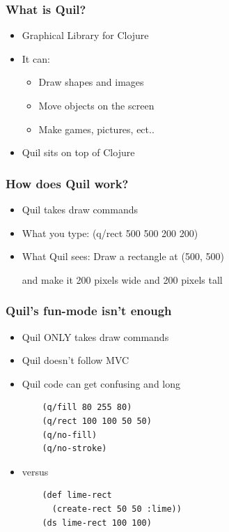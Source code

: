 \documentclass{beamer}
\begin{document}
\begin{frame}
	\frametitle{What is Quil?}
	\begin{itemize}
  		\item Graphical Library for Clojure
  		\item It can:
  		\begin{itemize}
  	 		\item Draw shapes and images
  	 		\item Move objects on the screen
  	 		\item Make games, pictures, ect..
  		\end{itemize}
  		\item Quil sits on top of Clojure
	 \end{itemize}
\end{frame}

\begin{frame}
	\frametitle{How does Quil work?}
	\begin{itemize}
  		\item Quil takes draw commands
  	 	\item What you type: (q/rect 500 500 200 200)
  	 	\item What Quil sees: Draw a rectangle at (500, 500)\par 
  	 	and make it 200 pixels wide and 200 pixels tall
	 \end{itemize}
\end{frame}

\begin{frame}[fragile]
\frametitle{Quil's fun-mode isn't enough}
	\begin{itemize}
		\item Quil ONLY takes draw commands
		\item Quil doesn't follow MVC
		\item Quil code can get confusing and long
		
			\begin{verbatim}
	(q/fill 80 255 80)
	(q/rect 100 100 50 50)
	(q/no-fill)
	(q/no-stroke)
			\end{verbatim}	


		\item versus
		\begin{verbatim}
	(def lime-rect 
	  (create-rect 50 50 :lime))
	(ds lime-rect 100 100)
			\end{verbatim}
	\end{itemize}
\end{frame}
\end{document}

